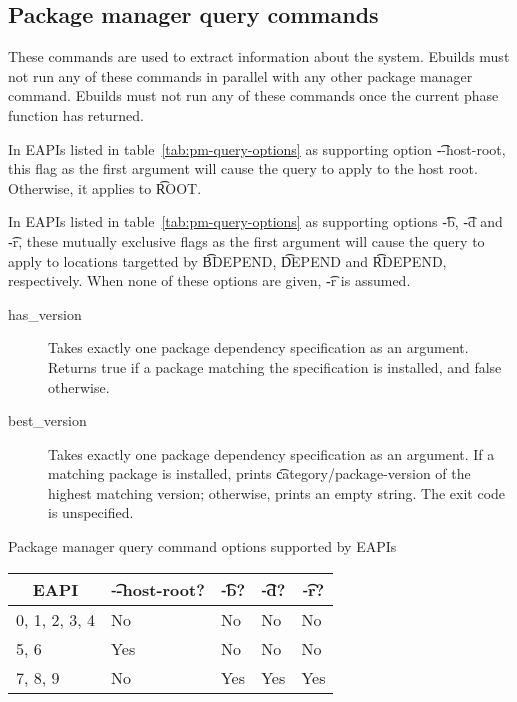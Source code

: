 \subsection{Package manager query commands}
These commands are used to extract information about the system. Ebuilds must not run any of
these commands in parallel with any other package manager command. Ebuilds must not run any of
these commands once the current phase function has returned.

 In EAPIs listed in table~\ref{tab:pm-query-options} as supporting
option \t{-{}-host-root}, this flag as the first argument will cause the query to apply to the
host root. Otherwise, it applies to \t{ROOT}.

In EAPIs listed in table~\ref{tab:pm-query-options} as supporting options \t{-b}, \t{-d} and \t{-r},
these mutually exclusive flags as the first argument will cause the query to apply to locations
targetted by \t{BDEPEND}, \t{DEPEND} and \t{RDEPEND}, respectively. When none of these options
are given, \t{-r} is assumed.

\begin{description}
\item[has_version] Takes exactly one package dependency specification as an argument. Returns
    true if a package matching the specification is installed, and false otherwise.
\item[best_version] Takes exactly one package dependency specification as an argument. If a matching
    package is installed, prints \t{category/package-version} of the highest matching version;
    otherwise, prints an empty string. The exit code is unspecified.
\end{description}

\begin{centertable}{Package manager query command options supported by EAPIs}
    \label{tab:pm-query-options}
    \begin{tabular}{lllll}
      \toprule
      \multicolumn{1}{c}{\textbf{EAPI}} &
      \multicolumn{1}{c}{\textbf{\t{-{}-host-root}?}} &
      \multicolumn{1}{c}{\textbf{\t{-b}?}} &
      \multicolumn{1}{c}{\textbf{\t{-d}?}} &
      \multicolumn{1}{c}{\textbf{\t{-r}?}} \\
      \midrule
      0, 1, 2, 3, 4     & No  & No  & No  & No  \\
      5, 6              & Yes & No  & No  & No  \\
      7, 8, 9           & No  & Yes & Yes & Yes \\
      \bottomrule
    \end{tabular}
\end{centertable}

